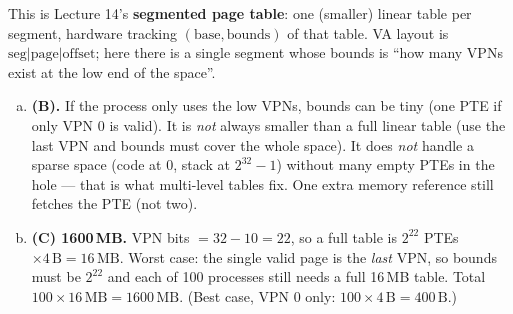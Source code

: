 \documentclass[11pt,a4paper]{article}
\newenvironment{Sol}{%
  \begin{tcolorbox}[sboxstyle, title={Solution}]%
}{%
  \end{tcolorbox}\vspace{0.35em}%
}
\begin{document}
\begin{Sol}
This is Lecture 14's \textbf{segmented page table}: one (smaller) linear
table per segment, hardware tracking $(\mathrm{base},\mathrm{bounds})$ of
that table. VA layout is $\mathrm{seg}\vert\mathrm{page}\vert\mathrm{offset}$;
here there is a single segment whose bounds is ``how many VPNs exist at
the low end of the space''.
\begin{enumerate}[(a)]
\item \textbf{(B).} If the process only uses the low VPNs, bounds can be
      tiny (one PTE if only VPN 0 is valid). It is \emph{not} always
      smaller than a full linear table (use the last VPN and bounds must
      cover the whole space). It does \emph{not} handle a sparse space
      (code at 0, stack at $2^{32}-1$) without many empty PTEs in the
      hole --- that is what multi-level tables fix. One extra memory
      reference still fetches the PTE (not two).
\item \textbf{(C) 1600\,MB.} VPN bits $= 32-10 = 22$, so a full table
      is $2^{22}$ PTEs $\times 4\,\mathrm{B} = 16\,\mathrm{MB}$. Worst
      case: the single valid page is the \emph{last} VPN, so bounds must
      be $2^{22}$ and each of 100 processes still needs a full 16\,MB
      table. Total $100\times 16\,\mathrm{MB} = 1600\,\mathrm{MB}$.
      (Best case, VPN 0 only: $100\times 4\,\mathrm{B} = 400\,\mathrm{B}$.)
\end{enumerate}
\end{Sol}
\end{document}
